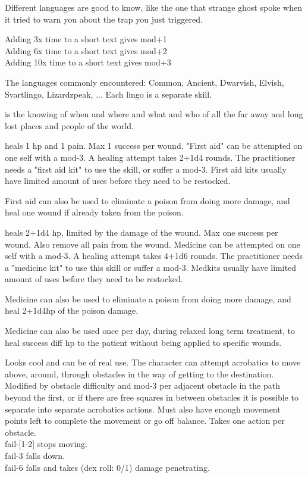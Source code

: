  Different languages are good to know, like the one that strange ghost spoke when it tried to warn you about the trap you just triggered.

Adding 3x time to a short text gives mod+1 \\
Adding 6x time to a short text gives mod+2 \\
Adding 10x time to a short text gives mod+3

The languages commonly encountered: Common, Ancient, Dwarvish, Elvish, Svartlingo, Lizardzpeak, ...  Each lingo is a separate skill.


 is the knowing of when and where and what and who of all the far away and long lost places and people of the world.


 heals 1 hp and 1 pain. Max 1 success per wound. "First aid" can be attempted on one self with a mod-3. A healing attempt takes 2+1d4 rounds. The practitioner needs a "first aid kit" to use the skill, or suffer a mod-3. First aid kits usually have limited amount of uses before they need to be restocked.

First aid can also be used to eliminate a poison from doing more damage, and heal one wound if already taken from the poison.


 heals 2+1d4 hp, limited by the damage of the wound. Max one success per wound. Also remove all pain from the wound. Medicine can be attempted on one self with a mod-3. A healing attempt takes 4+1d6 rounds. The practitioner needs a "medicine kit" to use this skill or suffer a mod-3. Medkits usually have limited amount of uses before they need to be restocked.

Medicine can also be used to eliminate a poison from doing more damage, and heal 2+1d4hp of the poison damage.

Medicine can also be used once per day, during relaxed long term treatment, to heal success diff hp to the patient without being applied to specific wounds.


 Looks cool and can be of real use. The character can attempt acrobatics to move above, around, through obstacles in the way of getting to the destination. Modified by obstacle difficulty and mod-3 per adjacent obstacle in the path beyond the first, or if there are free squares in between obstacles it is possible to separate into separate acrobatics actions. Must also have enough movement points left to complete the movement or go off balance. Takes one action per obstacle. \\
fail-[1-2] stops moving. \\
fail-3 falls down. \\
fail-6 falls and takes (dex roll: 0/1) damage penetrating.


